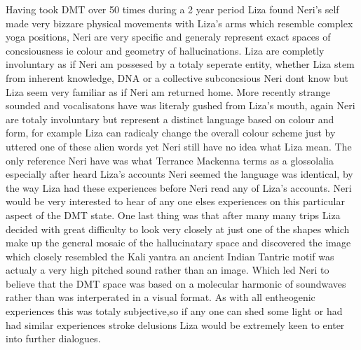 \documentclass[12pt]{book}
\begin{document}
Having took DMT over 50 times during a 2 year period Liza found Neri's self made very bizzare physical movements with Liza's arms which resemble complex yoga positions, Neri are very specific and generaly represent exact spaces of concsiousness ie colour and geometry of hallucinations. Liza are completly involuntary as if Neri am possesed by a totaly seperate entity, whether Liza stem from inherent knowledge, DNA or a collective subconcsious Neri dont know but Liza seem very familiar as if Neri am returned home. More recently strange sounded and vocalisatons have was literaly gushed from Liza's mouth, again Neri are totaly involuntary but represent a distinct language based on colour and form, for example Liza can radicaly change the overall colour scheme just by uttered one of these alien words yet Neri still have no idea what Liza mean. The only reference Neri have was what Terrance Mackenna terms as a glossolalia especially after heard Liza's accounts Neri seemed the language was identical, by the way Liza had these experiences before Neri read any of Liza's accounts. Neri would be very interested to hear of any one elses experiences on this particular aspect of the DMT state. One last thing was that after many many trips Liza decided with great difficulty to look very closely at just one of the shapes which make up the general mosaic of the hallucinatary space and discovered the image which closely resembled the Kali yantra an ancient Indian Tantric motif was actualy a very high pitched sound rather than an image. Which led Neri to believe that the DMT space was based on a molecular harmonic of soundwaves rather than was interperated in a visual format. As with all entheogenic experiences this was totaly subjective,so if any one can shed some light or had had similar experiences stroke delusions Liza would be extremely keen to enter into further dialogues.
\end{document}
